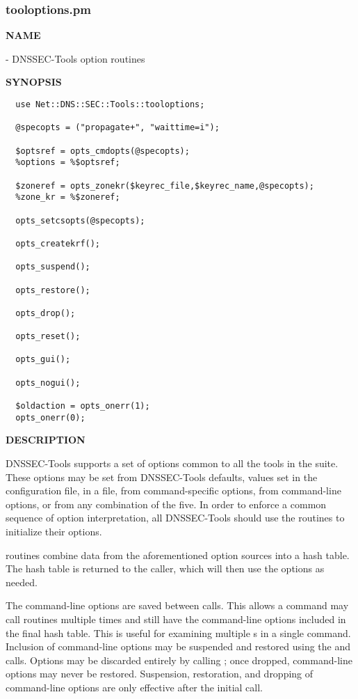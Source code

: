 \clearpage

\subsubsection{tooloptions.pm}

{\bf NAME}

 - DNSSEC-Tools option routines

{\bf SYNOPSIS}

\begin{verbatim}
  use Net::DNS::SEC::Tools::tooloptions;

  @specopts = ("propagate+", "waittime=i");

  $optsref = opts_cmdopts(@specopts);
  %options = %$optsref;

  $zoneref = opts_zonekr($keyrec_file,$keyrec_name,@specopts);
  %zone_kr = %$zoneref;

  opts_setcsopts(@specopts);

  opts_createkrf();

  opts_suspend();

  opts_restore();

  opts_drop();

  opts_reset();

  opts_gui();

  opts_nogui();

  $oldaction = opts_onerr(1);
  opts_onerr(0);
\end{verbatim}

{\bf DESCRIPTION}

DNSSEC-Tools supports a set of options common to all the tools in the suite.
These options may be set from DNSSEC-Tools defaults, values set in the
 configuration file, in a  file, from
command-specific options, from command-line options, or from any combination
of the five.  In order to enforce a common sequence of option interpretation,
all DNSSEC-Tools should use the  routines to initialize
their options.

 routines combine data from the aforementioned option
sources into a hash table.  The hash table is returned to the caller, which
will then use the options as needed.

The command-line options are saved between calls.  This allows a command may
call  routines multiple times and still have the
command-line options included in the final hash table.  This is useful for
examining multiple s in a single command.  Inclusion of
command-line options may be suspended and restored using the
 and  calls.  Options may be
discarded entirely by calling ; once dropped, command-line
options may never be restored.  Suspension, restoration, and dropping of
command-line options are only effective after the initial
 call.

